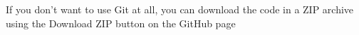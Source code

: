 If you don't want to use Git at all, you can download the code in a ZIP archive using the {\sf Download ZIP} button on the GitHub page
